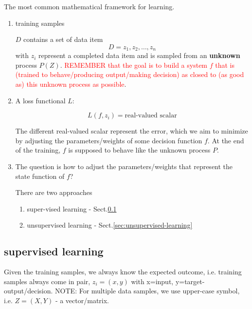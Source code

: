 The most common mathematical framework for learning.
\begin{enumerate}
  \item training samples

$D$ contains a set of data item
\begin{equation}
D = {z_1, z_2, \ldots, z_n}
\end{equation}
with $z_i$ represent a completed data item and is sampled from an {\bf
unknown} process $P(Z)$. \textcolor{red}{REMEMBER that the goal is to build a
system $f$ that is (trained to behave/producing output/making decision) as
closed to (as good as) this unknown process as possible}.
  
  \item A loss functional $L$: 

\begin{equation}
L(f, z_i) = \text{real-valued scalar}
\end{equation}  

The different real-valued scalar represent the error, which we aim to minimize
by adjusting the parameters/weights of some decision function $f$.
At the end of the training, $f$ is supposed to behave like the unknown process $P$.


   \item The question is how to adjust the parameters/weights that represent the
   state function of $f$? 
   
   There are two approaches
   \begin{enumerate}
     \item super-vised learning - Sect.\ref{sec:supervised-learning}
     \item unsupervised learning - Sect.\ref{sec:unsupervised-learning}
   \end{enumerate} 
\end{enumerate}

\subsection{supervised learning}
\label{sec:supervised-learning}

Given the training samples, we always know the expected outcome, i.e. 
training samples always come in pair, $z_i=(x,y)$ with x=input,
y=target-output/decision.  NOTE: For multiple data samples, we use upper-case
symbol, i.e. $Z=(X,Y)$ - a vector/matrix.

